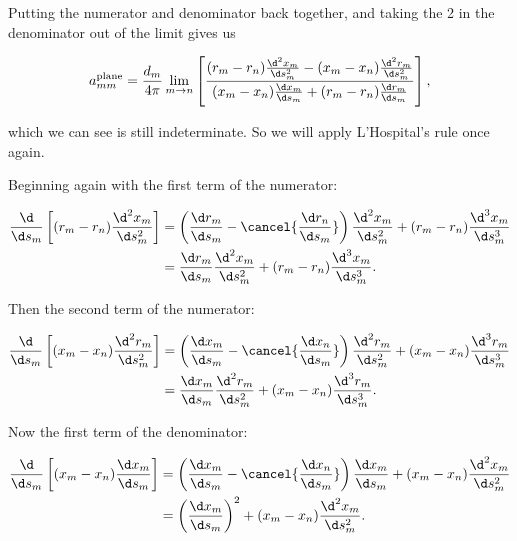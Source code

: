 Putting the numerator and denominator back together, and taking the 2 in the denominator out of the limit gives us

\begin{equation}
    a^\text{plane}_{mm} = \frac{d_m}{4 \pi} \lim_{m\rightarrow n} \left[\frac{(r_m-r_n)\frac{\d^2 x_m}{\d s_m^2} - (x_m-x_n)\frac{\d^2 r_m}{\d s_m^2}}{(x_m-x_n)\frac{\d x_m}{\d s_m} + (r_m-r_n)\frac{\d r_m}{\d s_m}}\right],
\end{equation}

\noindent which we can see is still indeterminate.
So we will apply L'Hospital's rule once again.

Beginning again with the first term of the numerator:

\begin{equation}
    \begin{aligned}
        \frac{\d}{\d s_m} \left[(r_m-r_n)\frac{\d^2 x_m}{\d s_m^2}\right] &= \left(\frac{\d r_m}{\d s_m} - \cancel{\frac{\d r_n}{\d s_m}}\right)\frac{\d^2 x_m}{\d s_m^2}+(r_m-r_n)\frac{\d^3 x_m}{\d s_m^3}\\
        &= \frac{\d r_m}{\d s_m} \frac{\d^2 x_m}{\d s_m^2}+(r_m-r_n)\frac{\d^3 x_m}{\d s_m^3}.
    \end{aligned}
\end{equation}

\noindent Then the second term of the numerator:

\begin{equation}
    \begin{aligned}
        \frac{\d}{\d s_m} \left[(x_m-x_n)\frac{\d^2 r_m}{\d s_m^2}\right] &= \left(\frac{\d x_m}{\d s_m} - \cancel{\frac{\d x_n}{\d s_m}}\right)\frac{\d^2 r_m}{\d s_m^2}+(x_m-x_n)\frac{\d^3 r_m}{\d s_m^3}\\
        &= \frac{\d x_m}{\d s_m} \frac{\d^2 r_m}{\d s_m^2}+(x_m-x_n)\frac{\d^3 r_m}{\d s_m^3}.
    \end{aligned}
\end{equation}

Now the first term of the denominator:

\begin{equation}
    \begin{aligned}
        \frac{\d}{\d s_m} \left[(x_m-x_n)\frac{\d x_m}{\d s_m}\right] &= \left(\frac{\d x_m}{\d s_m} - \cancel{\frac{\d x_n}{\d s_m}}\right)\frac{\d x_m}{\d s_m}+(x_m-x_n)\frac{\d^2 x_m}{\d s_m^2}\\
        &= \left(\frac{\d x_m}{\d s_m}\right)^2+(x_m-x_n)\frac{\d^2 x_m}{\d s_m^2}.
    \end{aligned}
\end{equation}

